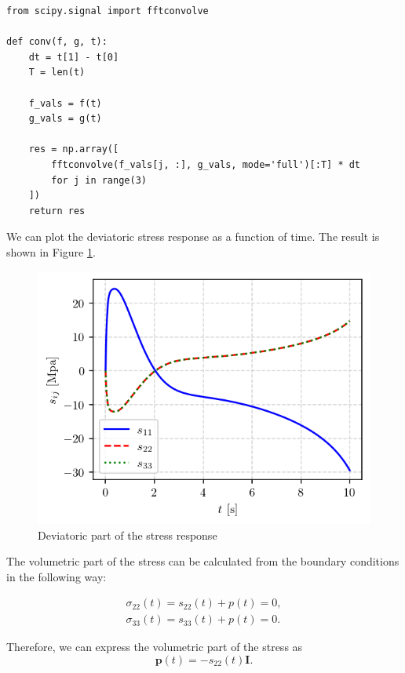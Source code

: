 \documentclass[12pt,a4paper]{article}
\begin{document}
\lstset{style=python}
\begin{lstlisting}
from scipy.signal import fftconvolve

def conv(f, g, t):
    dt = t[1] - t[0]
    T = len(t)

    f_vals = f(t)
    g_vals = g(t)

    res = np.array([
        fftconvolve(f_vals[j, :], g_vals, mode='full')[:T] * dt
        for j in range(3)
    ])
    return res
\end{lstlisting}


We can plot the deviatoric stress response as a function of time. The result is shown in Figure \ref{fig:viscoelastic_stress}.
\begin{figure}[H]
    \centering
    \includegraphics[scale=1]{figures/deviatoric_response.png}
    \caption{Deviatoric part of the stress response}
    \label{fig:viscoelastic_stress}
\end{figure}

The volumetric part of the stress can be calculated from the boundary conditions in the following way:

\begin{equation}
    \begin{matrix}
        \sigma_{22}(t) = s_{22}(t) + p(t) = 0, \\
        \sigma_{33}(t) = s_{33}(t) + p(t) = 0.
    \end{matrix}
\end{equation}

Therefore, we can express the volumetric part of the stress as
\begin{equation}
    \boldsymbol{p}(t) = - s_{22}(t)\boldsymbol{I}.
\end{equation}
\end{document}
